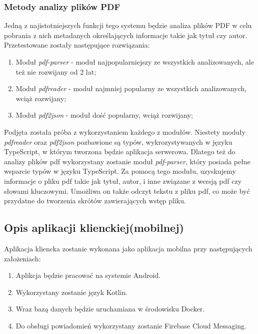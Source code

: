 \documentclass[8pt]{article}
\begin{document}
	\subsubsection{Metody analizy plików PDF}
		\hspace{10pt} Jedną z najistotniejszych funkcji tego systemu będzie analiza plików PDF w celu pobrania z nich metadanych określających informacje takie jak tytuł czy autor. 
		Przetestowane zostały następujące rozwiązania:
			\begin{enumerate}
			\item Moduł \textit{pdf-parser} - moduł najpopularniejszy ze wszystkich analizowanych, ale też nie rozwijany od 2 lat;
			\item Moduł \textit{pdfreader} - moduł najmniej popularny ze wszystkich analizowanych, wciąż rozwijany;
			\item Moduł \textit{pdf2json} - moduł dość popularny, wciąż rozwijany;
		\end{enumerate}
		\hspace{10pt} Podjęta została próba z wykorzystaniem każdego z modułów. Niestety moduły \textit{pdfreader} oraz \textit{pdf2json} pozbawione są typów, wykrozystywanych w języku TypeScript, w którym tworzona będzie aplikacja serwerowa. Dlatego też do analizy plików pdf wykorzystany zostanie moduł \textit{pdf-parser}, który posiada pełne wsparcie typów w języku TypeScript. Za pomocą tego modułu, uzyskujemy informacje o pliku pdf takie jak tytuł, autor, i inne związane z wersją pdf czy słowami kluczowymi. Umożliwa on także odczyt tekstu z pliku pdf, co może być przydatne do tworzenia skrótów zawierających wstęp pliku. 

	\subsection{Opis aplikacji klienckiej(mobilnej)}
	\hspace{10pt} Aplikacja kliencka zostanie wykonana jako aplikacja mobilna przy następujących założeniach:
	\begin{enumerate}
		\item Aplikcja będzie pracować na systemie Android.
		\item Wykorzystany zostanie język Kotlin.
		\item Wraz bazą danych będzie uruchamiana w środowisku Docker.
		\item Do obsługi powiadomień wykorzystany zostanie Firebase Cloud Messaging.
	\end{enumerate}
\end{document}
